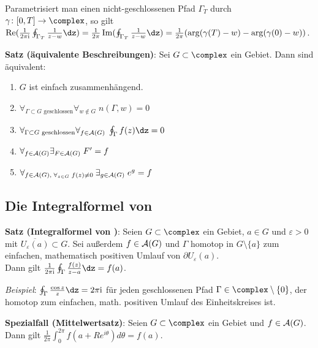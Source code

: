 Parametrisiert man einen nicht-geschlossenen Pfad
$\Gamma_T$ durch $\gamma\colon [0, T] \rightarrow \complex$, so gilt\\
$\Re(\frac{1}{2\pi\i} \oint_{\Gamma_T} \frac{1}{z - w} \dz) =
\frac{1}{2\pi} \Im(\oint_{\Gamma_T} \frac{1}{z - w} \dz) =
\frac{1}{2\pi} (\arg(\gamma(T) - w) - \arg(\gamma(0) - w))$.

\textbf{Satz (äquivalente Beschreibungen)}:
Sei $G \subset \complex$ ein Gebiet.
Dann sind äquivalent:
\begin{enumerate}
    \item
    $G$ ist einfach zusammenhängend.
    
    \item
    $\forall_{\Gamma \subset G \text{ geschlossen}} \forall_{w \notin G}\;
    n(\Gamma, w) = 0$
    
    \item
    $\forall_{\Gamma \subset G \text{ geschlossen}} \forall_{f \in \A(G)}\;
    \oint_\Gamma f(z)\dz = 0$
    
    \item
    $\forall_{f \in \mathcal{A}(G)} \exists_{F \in \mathcal{A}(G)}\; F' = f$
    
    \item
    $\forall_{f \in \mathcal{A}(G),\; \forall_{z \in G}\; f(z) \not= 0\;}
    \exists_{g \in \mathcal{A}(G)}\; e^g = f$
\end{enumerate}

\subsection{%
    Die Integralformel von %
}

\textbf{Satz (Integralformel von )}:
Seien $G \subset \complex$ ein Gebiet, $a \in G$ und $\varepsilon > 0$
mit $\overline{U_\varepsilon(a)} \subset G$.
Sei außerdem $f \in \mathcal{A}(G)$ und $\Gamma$ homotop in
$G \setminus \{a\}$ zum einfachen, mathematisch positiven Umlauf von
$\partial U_\varepsilon(a)$.\\
Dann gilt $\frac{1}{2\pi\i} \oint_\Gamma \frac{f(z)}{z - a} \dz = f(a)$.

\emph{Beispiel}:
$\oint_\Gamma \frac{\cos z}{z} \dz = 2\pi\i$ für jeden geschlossenen Pfad
$\Gamma \in \complex \setminus \{0\}$, der homotop zum einfachen,
math. positiven Umlauf des Einheitskreises ist.

\textbf{Spezialfall (Mittelwertsatz)}:
Seien $G \subset \complex$ ein Gebiet und $f \in \mathcal{A}(G)$.\\
Dann gilt $\frac{1}{2\pi} \int_0^{2\pi} f(a + Re^{i\theta}) d\theta = f(a)$.

